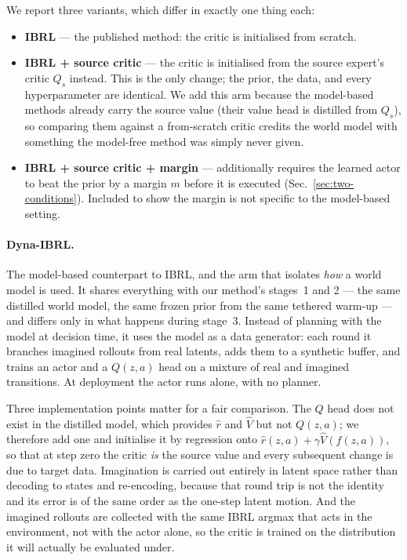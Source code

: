We report three variants, which differ in exactly one thing each:
\begin{itemize}
\item \textbf{IBRL} --- the published method: the critic is initialised from
      scratch.
\item \textbf{IBRL + source critic} --- the critic is initialised from the
      source expert's critic $Q_s$ instead. This is the only change; the prior,
      the data, and every hyperparameter are identical. We add this arm because
      the model-based methods already carry the source value (their value head
      is distilled from $Q_s$), so comparing them against a from-scratch critic
      credits the world model with something the model-free method was simply
      never given.
\item \textbf{IBRL + source critic + margin} --- additionally requires the
      learned actor to beat the prior by a margin $m$ before it is executed
      (Sec.~\ref{sec:two-conditions}). Included to show the margin is not
      specific to the model-based setting.
\end{itemize}

\paragraph{Dyna-IBRL.}
The model-based counterpart to IBRL, and the arm that isolates \emph{how} a
world model is used. It shares everything with our method's stages~1 and 2 ---
the same distilled world model, the same frozen prior from the same
tethered warm-up --- and differs only in what happens during stage~3.
Instead of planning with the model at decision time, it uses the model as a data
generator: each round it branches imagined rollouts from real latents, adds them
to a synthetic buffer, and trains an actor and a $Q(z,a)$ head on a mixture of
real and imagined transitions. At deployment the actor runs alone, with no
planner.

Three implementation points matter for a fair comparison. The $Q$ head does not
exist in the distilled model, which provides $\hat r$ and $\hat V$ but not
$Q(z,a)$; we therefore add one and initialise it by regression onto
$\hat r(z,a) + \gamma \hat V(f(z,a))$, so that at step zero the critic
\emph{is} the source value and every subsequent change is due to target data.
Imagination is carried out entirely in latent space rather than decoding to
states and re-encoding, because that round trip is not the identity and its
error is of the same order as the one-step latent motion. And the imagined
rollouts are collected with the same IBRL argmax that acts in the environment,
not with the actor alone, so the critic is trained on the distribution it will
actually be evaluated under.

